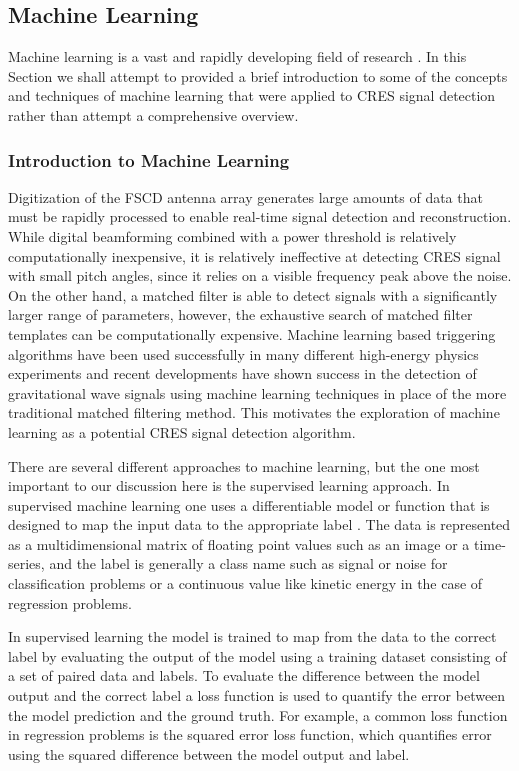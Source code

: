 \subsection{Machine Learning}

Machine learning is a vast and rapidly developing field of research \cite{prml}. In this Section we shall attempt to provided a brief introduction to some of the concepts and techniques of machine learning that were applied to CRES signal detection rather than attempt a comprehensive overview.

\subsubsection*{Introduction to Machine Learning}
\label{sec:chap4-intro-ml}

Digitization of the FSCD antenna array generates large amounts of data that must be rapidly processed to enable real-time signal detection and reconstruction. While digital beamforming combined with a power threshold is relatively computationally inexpensive, it is relatively ineffective at detecting CRES signal with small pitch angles, since it relies on a visible frequency peak above the noise. On the other hand, a matched filter is able to detect signals with a significantly larger range of parameters, however, the exhaustive search of matched filter templates can be computationally expensive. Machine learning based triggering algorithms have been used successfully in many different high-energy physics experiments \cite{ml_lhc} and recent developments have shown success in the detection of gravitational wave signals using machine learning techniques \cite{ml_ligo_1,ml_ligo_2} in place of the more traditional matched filtering method. This motivates the exploration of machine learning as a potential CRES signal detection algorithm. 

There are several different approaches to machine learning, but the one most important to our discussion here is the supervised learning approach. In supervised machine learning one uses a differentiable model or function that is designed to map the input data to the appropriate label \cite{prml}. The data is represented as a multidimensional matrix of floating point values such as an image or a time-series, and the label is generally a class name such as signal or noise for classification problems or a continuous value like kinetic energy in the case of regression problems. 

In supervised learning the model is trained to map from the data to the correct label by evaluating the output of the model using a training dataset consisting of a set of paired data and labels. To evaluate the difference between the model output and the correct label a loss function is used to quantify the error between the model prediction and the ground truth. For example, a common loss function in regression problems is the squared error loss function, which quantifies error using the squared difference between the model output and label. 

